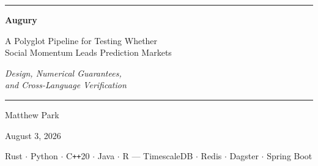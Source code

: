 \documentclass[11pt]{article}
\begin{document}
\pagestyle{empty}

\begin{titlepage}
\thispagestyle{empty}
\centering
\vspace*{3.4cm}

{\color{augGrey}\rule{\textwidth}{0.8pt}}
\vspace{0.8cm}

{\LARGE\bfseries Augury\par}
\vspace{0.45cm}
{\Large A Polyglot Pipeline for Testing Whether\\[0.25em]
Social Momentum Leads Prediction Markets\par}
\vspace{0.7cm}
{\large\itshape Design, Numerical Guarantees,\\ and Cross-Language Verification\par}
\vspace{0.8cm}
{\color{augGrey}\rule{\textwidth}{0.8pt}}

\vspace{2.2cm}
{\large Matthew Park\par}
\vspace{0.35cm}
{\normalsize August 3, 2026\par}

\vfill
{\footnotesize\color{augGrey}
Rust $\cdot$ Python $\cdot$ C\texttt{++}20 $\cdot$ Java $\cdot$ R \quad---\quad
TimescaleDB $\cdot$ Redis $\cdot$ Dagster $\cdot$ Spring Boot\par}
\vspace{1.2cm}
\end{titlepage}
\end{document}
